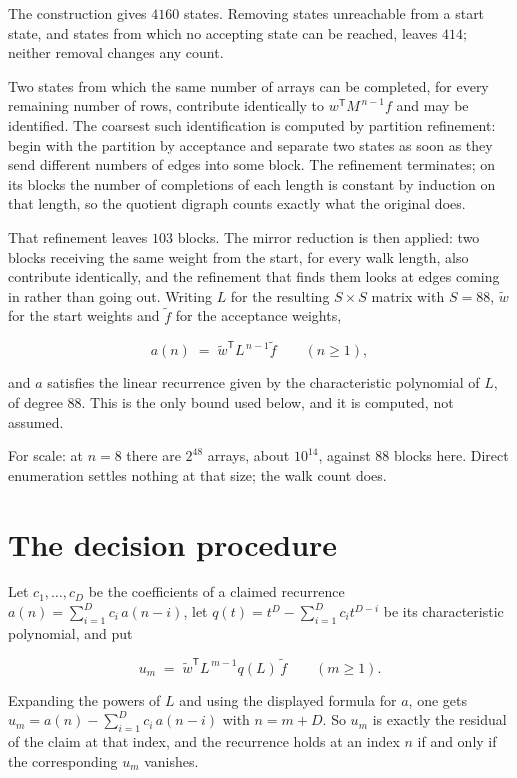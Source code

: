 \documentclass[11pt]{article}
\theoremstyle{definition}
\begin{document}
The construction gives $4160$ states. Removing states unreachable from a start state, and states from which no accepting state can be reached, leaves $414$; neither removal changes any count.

Two states from which the same number of arrays can be completed, for every remaining number of rows, contribute identically to $w^{\mathsf T}M^{\,n-1}f$ and may be identified. The coarsest such identification is computed by partition refinement: begin with the partition by acceptance and separate two states as soon as they send different numbers of edges into some block. The refinement terminates; on its blocks the number of completions of each length is constant by induction on that length, so the quotient digraph counts exactly what the original does.

That refinement leaves $103$ blocks. The mirror reduction is then applied: two blocks receiving the same weight from the start, for every walk length, also contribute identically, and the refinement that finds them looks at edges coming in rather than going out. Writing $L$ for the resulting $S \times S$ matrix with $S = 88$, $\tilde w$ for the start weights and $\tilde f$ for the acceptance weights,

\[a(n) \;=\; \tilde w^{\mathsf T} L^{\,n-1} \tilde f \qquad (n \ge 1),\]

and $a$ satisfies the linear recurrence given by the characteristic polynomial of $L$, of degree $88$. This is the only bound used below, and it is computed, not assumed.

For scale: at $n = 8$ there are $2^{48}$ arrays, about $10^{14}$, against $88$ blocks here. Direct enumeration settles nothing at that size; the walk count does.

\section{The decision procedure}

Let $c_1,\dots,c_D$ be the coefficients of a claimed recurrence $a(n) = \sum_{i=1}^{D} c_i\,a(n-i)$, let $q(t) = t^{D} - \sum_{i=1}^{D} c_i t^{D-i}$ be its characteristic polynomial, and put

\[u_m \;=\; \tilde w^{\mathsf T} L^{\,m-1} q(L)\,\tilde f \qquad (m \ge 1).\]

Expanding the powers of $L$ and using the displayed formula for $a$, one gets $u_m = a(n) - \sum_{i=1}^{D} c_i\,a(n-i)$ with $n = m + D$. So $u_m$ is exactly the residual of the claim at that index, and the recurrence holds at an index $n$ if and only if the corresponding $u_m$ vanishes.
\end{document}
